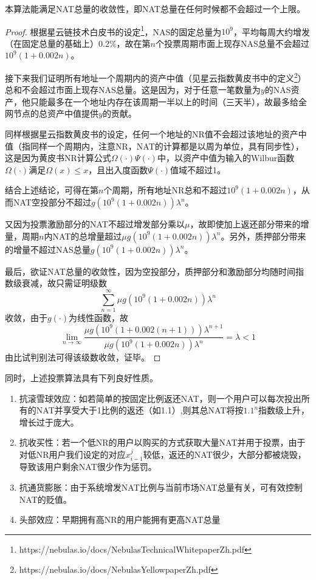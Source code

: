 \begin{property}
本算法能满足NAT总量的收敛性，即NAT总量在任何时候都不会超过一个上限。
\end{property}
\begin{proof}
	根据星云链技术白皮书的设定\footnote{https://nebulas.io/docs/NebulasTechnicalWhitepaperZh.pdf}，NAS的固定总量为$10^9$，平均每周大约增发（在固定总量的基础上）$0.2\%$，故在第$n$个投票周期市面上现存NAS总量不会超过$10^9(1+0.002n)$。
	
	接下来我们证明所有地址一个周期内的资产中值（见星云指数黄皮书中的定义\footnote{https://nebulas.io/docs/NebulasYellowpaperZh.pdf}）总和不会超过市面上现存NAS总量。这是因为，对于任意一笔数量为$y$的NAS资产，他只能最多在一个地址内存在该周期一半以上的时间（三天半），故最多给全网节点的总资产中值提供$y$的贡献。
	
	同样根据星云指数黄皮书的设定，任何一个地址的NR值不会超过该地址的资产中值（指同样一个周期内，注意NR，NAT的计算都是以周为单位，具有同步性），这是因为黄皮书NR计算公式$\Omega(\cdot)\Psi(\cdot)$中，以资产中值为输入的Wilbur函数$\Omega(\cdot)$满足$\Omega(x)\leq x$，且出入度函数$\Psi(\cdot)$值域不超过1。
	
	结合上述结论，可得在第$n$个周期，所有地址NR总和不超过$10^9(1+0.002n)$，从而NAT空投部分不超过$g(10^9(1+0.002n))\lambda^n$。
	
	又因为投票激励部分的NAT不超过增发部分乘以$\mu$，故即使加上返还部分带来的增量，周期$n$内NAT的总增量超过$\mu g(10^9(1+0.002n))\lambda^n$。另外，质押部分带来的增量不超过NAS总量$g(10^9(1+0.002n))\lambda^n$。
	
	最后，欲证NAT总量的收敛性，因为空投部分，质押部分和激励部分均随时间指数级衰减，故只需证明级数
	$$\sum_{n=1}^{\infty} \mu g(10^9(1+0.002n))\lambda^n$$
	收敛，由于$g(\cdot)$为线性函数，故
	$$ \lim_{n\rightarrow \infty} \frac{\mu g(10^9(1+0.002(n+1)))\lambda^{n+1}}{\mu g(10^9(1+0.002n))\lambda^n} = \lambda <1$$
	由比试判别法可得该级数收敛，证毕。
\end{proof}
同时，上述投票算法具有下列良好性质。
\begin{enumerate}
	\item 抗滚雪球效应：如若简单的按固定比例返还NAT，则一个用户可以每次投出所有的NAT并享受大于1比例的返还（如1.1）,则其总NAT将按$1.1^n$指数级上升，增长过于庞大。
	\item 抗收买性：若一个低NR的用户以购买的方式获取大量NAT并用于投票，由于对低NR用户我们设定的对应$x_{i-1}^j$较低，返还的NAT很少，大部分都被烧毁，导致该用户剩余NAT很少作为惩罚。
	\item 抗通货膨胀：由于系统增发NAT比例与当前市场NAT总量有关，可有效控制NAT的贬值。
	\item 头部效应：早期拥有高NR的用户能拥有更高NAT总量
\end{enumerate}